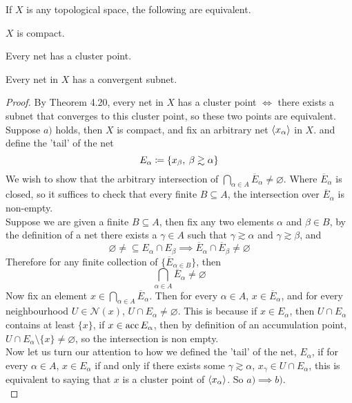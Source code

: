 \documentclass[../../main.tex]{subfiles}
\begin{document}
\begin{wts}
If $X$ is any topological space, the following are equivalent.

\begin{enumalpha}
    \item $X$ is compact.
    \item Every net has a cluster point.
    \item Every net in $X$ has a convergent subnet.
\end{enumalpha}
\end{wts}
\newcommand{\xa}{\abrackets{x_\alpha}} %
\newcommand{\n}[1]{\mathcal{N}({#1})} %
\begin{proof}
By Theorem 4.20, every net in $X$ has a cluster point $\iff$ there exists a subnet that converges to this cluster point, so these two points are equivalent. \\

Suppose $a)$ holds, then $X$ is compact, and fix an arbitrary net $\xa$ in $X$. and define the 'tail' of the net 
\[
E_\alpha\coloneqq\{x_\beta,\:\beta\gtrsim\alpha\}
\]
We wish to show that the arbitrary intersection of $\bigcap_{\alpha\in A}\overline{E}_\alpha\neq\varnothing$. Where $\overline{E}_\alpha$ is closed, so it suffices to check that every finite $B\subseteq A$, the intersection over $\overline{E}_\alpha$ is non-empty.\\

Suppose we are given a finite $B\subseteq A$, then fix any two elements $\alpha$ and $\beta\in B$, by the definition of a net there exists a $\gamma\in A$ such that $\gamma\gtrsim\alpha$ and $\gamma\gtrsim\beta$, and
\[
\varnothing\neq\subseteq E_\alpha\cap E_\beta\implies \overline{E}_\alpha\cap\overline{E}_\beta\neq\varnothing
\]
Therefore for any finite collection of $\{\overline{E}_{\alpha\in B}\}$, then 
\[
\bigcap_{\alpha\in A}\overline{E}_\alpha\neq\varnothing
\]
Now fix an element $x\in \bigcap_{\alpha\in A}\overline{E}_\alpha$. Then for every $\alpha\in A$, $x\in \overline{E}_\alpha$, and for every neighbourhood $U\in\n{x}$, $U\cap E_\alpha\neq\varnothing$. This is because if $x\in E_\alpha$, then $U\cap E_\alpha$ contains at least $\{x\}$, if $x\in\operatorname{acc}{E_\alpha}$, then by definition of an accumulation point, $U\cap E_\alpha\setminus\{x\}\neq\varnothing$, so the intersection is non empty.\\

Now let us turn our attention to how we defined the 'tail' of the net, $E_\alpha$, if for every $\alpha\in A$, $x\in E_\alpha$ if and only if there exists some $\gamma\gtrsim\alpha$, $x_\gamma\in U\cap E_\alpha$, this is equivalent to saying that $x$ is a cluster point of $\xa$. So $a)\implies b)$.\\


\end{proof}
\end{document}
